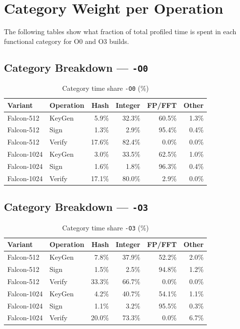\documentclass[11pt,a4paper]{article}
\begin{document}
\section{Category Weight per Operation}

The following tables show what fraction of total profiled time
is spent in each functional category for O0 and O3 builds.

\subsection{Category Breakdown --- \texttt{-O0}}

\begin{table}[h!]
\centering
\caption{Category time share \texttt{-O0} (\%)}
\begin{tabular}{llrrrr}
\toprule
Variant & Operation & \colorbox{hashcolor}{Hash} & \colorbox{intcolor}{Integer} & \colorbox{fpcolor}{FP/FFT} & Other \\
\midrule
  Falcon-512 & KeyGen & 5.9\% & 32.3\% & 60.5\% & 1.3\% \\
  Falcon-512 & Sign & 1.3\% & 2.9\% & 95.4\% & 0.4\% \\
  Falcon-512 & Verify & 17.6\% & 82.4\% & 0.0\% & 0.0\% \\
  Falcon-1024 & KeyGen & 3.0\% & 33.5\% & 62.5\% & 1.0\% \\
  Falcon-1024 & Sign & 1.6\% & 1.8\% & 96.3\% & 0.4\% \\
  Falcon-1024 & Verify & 17.1\% & 80.0\% & 2.9\% & 0.0\% \\
\bottomrule
\end{tabular}
\end{table}

\subsection{Category Breakdown --- \texttt{-O3}}

\begin{table}[h!]
\centering
\caption{Category time share \texttt{-O3} (\%)}
\begin{tabular}{llrrrr}
\toprule
Variant & Operation & \colorbox{hashcolor}{Hash} & \colorbox{intcolor}{Integer} & \colorbox{fpcolor}{FP/FFT} & Other \\
\midrule
  Falcon-512 & KeyGen & 7.8\% & 37.9\% & 52.2\% & 2.0\% \\
  Falcon-512 & Sign & 1.5\% & 2.5\% & 94.8\% & 1.2\% \\
  Falcon-512 & Verify & 33.3\% & 66.7\% & 0.0\% & 0.0\% \\
  Falcon-1024 & KeyGen & 4.2\% & 40.7\% & 54.1\% & 1.1\% \\
  Falcon-1024 & Sign & 1.1\% & 3.2\% & 95.5\% & 0.3\% \\
  Falcon-1024 & Verify & 20.0\% & 73.3\% & 0.0\% & 6.7\% \\
\bottomrule
\end{tabular}
\end{table}
\end{document}
